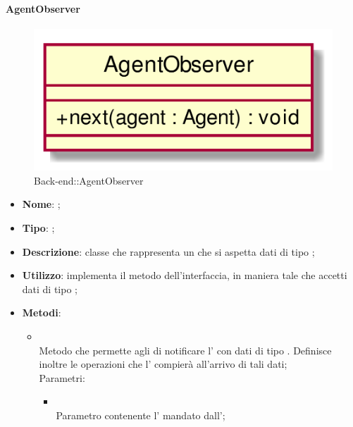 \hypertarget{AgentObserver_label}{\paragraph{AgentObserver}}
\begin{figure}[h]
	\centering
	\includegraphics[width=\textwidth,height=\textheight,keepaspectratio]{images/ClassAgentObserver.png}
	\caption{Back-end::AgentObserver}
\end{figure}
\begin{itemize}
	\item \textbf{Nome}: ;
	\item \textbf{Tipo}: ;
	\item \textbf{Descrizione}: classe che rappresenta un  che si aspetta dati di tipo ;
	\item \textbf{Utilizzo}: implementa il metodo  dell'interfaccia, in maniera tale che accetti dati di tipo ;
	\item \textbf{Metodi}:
	\begin{itemize}
		\item[]  \\
		Metodo che permette agli  di notificare l' con dati di tipo . Definisce inoltre le operazioni che l' compierà all'arrivo di tali dati;\\
		Parametri:
		\begin{itemize}
			\item {} \\
			Parametro contenente l' mandato dall';
		\end{itemize}
	\end{itemize}
\end{itemize}
\FloatBarrier

